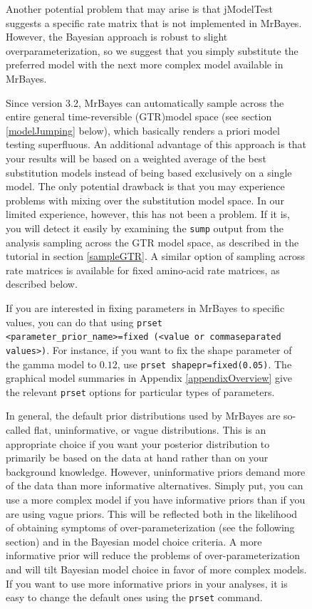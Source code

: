 \documentclass[12pt]{book}
\newcommand{\ttt}[1]{\texttt{#1}}
\begin{document}
\begin{figure}[h]
Another potential problem that may arise is that jModelTest suggests a specific rate matrix that is
not implemented in MrBayes. However, the Bayesian approach is robust to slight
overparameterization, so we suggest that you simply substitute the preferred model with the next
more complex model available in MrBayes.

Since version 3.2, MrBayes can automatically sample across the entire general time-reversible
(GTR)model space (see section \ref{modelJumping} below), which basically renders a priori model
testing superfluous. An additional advantage of this approach is that your results will be based on
a weighted average of the best substitution models instead of being based exclusively on a single
model. The only potential drawback is that you may experience problems with mixing over the
substitution model space. In our limited experience, however, this has not been a problem. If it
is, you will detect it easily by examining the \ttt{sump} output from the analysis sampling across
the GTR model space, as described in the tutorial in section \ref{sampleGTR}. A similar option of
sampling across rate matrices is available for fixed amino-acid rate matrices, as described below.

If you are interested in fixing parameters in MrBayes to specific values, you can do that using
\ttt{prset <parameter\_prior\_name>=fixed (<value or commaseparated values>)}. For instance, if
you want to fix the shape parameter of the gamma model to $0.12$, use \ttt{prset
shapepr=fixed(0.05)}. The graphical model summaries in Appendix \ref{appendixOverview} give the
relevant \ttt{prset} options for particular types of parameters.

In general, the default prior distributions used by MrBayes are so-called flat, uninformative, or
vague distributions. This is an appropriate choice if you want your posterior distribution to
primarily be based on the data at hand rather than on your background knowledge. However,
uninformative priors demand more of the data than more informative alternatives. Simply put, you
can use a more complex model if you have informative priors than if you are using vague priors.
This will be reflected both in the likelihood of obtaining symptoms of over-parameterization (see
the following section) and in the Bayesian model choice criteria. A more informative prior will
reduce the problems of over-parameterization and will tilt Bayesian model choice in favor of more
complex models. If you want to use more informative priors in your analyses, it is easy to change
the default ones using the \ttt{prset} command.


\end{figure}
\end{document}
